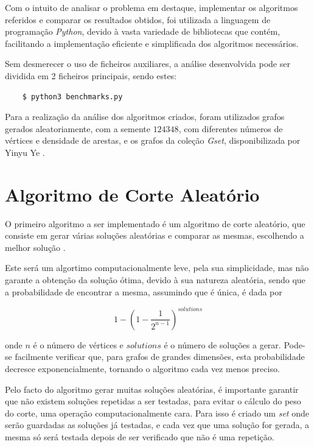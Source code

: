 \documentclass[mirror, portugues]{revdetua}
\begin{document}
Com o intuito de analisar o problema em destaque, implementar os algoritmos referidos e comparar os resultados obtidos, foi utilizada a linguagem de programação \textit{Python}, devido à vasta variedade de bibliotecas que contém, facilitando a implementação eficiente e simplificada dos algoritmos necessários.

Sem desmerecer o uso de ficheiros auxiliares, a análise desenvolvida pode ser dividida em 2 ficheiros principais, sendo estes:
\begin{verbatim}
    $ python3 benchmarks.py
\end{verbatim}

Para a realização da análise dos algoritmos criados, foram utilizados grafos gerados aleatoriamente, com a semente $124348$, com diferentes números de vértices e densidade de arestas, e os grafos da coleção \textit{Gset}, disponibilizada por Yinyu Ye \cite{GS24}.

\section{Algoritmo de Corte Aleatório}

O primeiro algoritmo a ser implementado é um algoritmo de corte aleatório, que consiste em gerar várias soluções aleatórias e comparar as mesmas, escolhendo a melhor solução \cite{AG14}.

Este será um algortimo computacionalmente leve, pela sua simplicidade, mas não garante a obtenção da solução ótima, devido à sua natureza aleatória, sendo que a probabilidade de encontrar a mesma, assumindo que é única, é dada por

$$1 - \left( 1 - \frac{1}{2^{n-1}} \right)^{solutions}$$

\noindent onde $n$ é o número de vértices e $solutions$ é o número de soluções a gerar. Pode-se facilmente verificar que, para grafos de grandes dimensões, esta probabilidade decresce exponencialmente, tornando o algoritmo cada vez menos preciso.

Pelo facto do algoritmo gerar muitas soluções aleatórias, é importante garantir que não existem soluções repetidas a ser testadas, para evitar o cálculo do peso do corte, uma operação computacionalmente cara. Para isso é criado um \textit{set} onde serão guardadas as soluções já testadas, e cada vez que uma solução for gerada, a mesma só será testada depois de ser verificado que não é uma repetição. 
\end{document}
